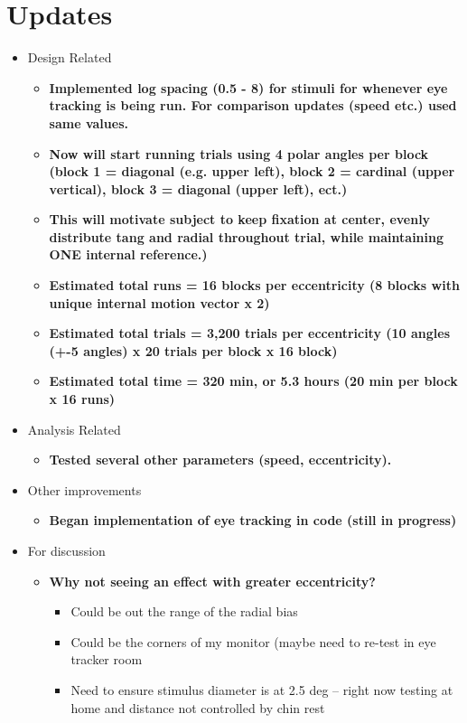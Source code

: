 \documentclass[11pt]{article} %
\begin{document}
\newpage
\section{Updates} 
\begin{itemize}
\item Design Related
	\begin{itemize}
	\item \textbf{Implemented log spacing (0.5 - 8) for stimuli for whenever eye tracking is being run. For comparison updates (speed etc.) used same values.}
	\item \textbf{Now will start running trials using 4 polar angles per block (block 1 = diagonal (e.g. upper left), block 2 = cardinal (upper vertical), block 3 = diagonal (upper left), ect.)}
	\item \textbf{This will motivate subject to keep fixation at center, evenly distribute tang and radial throughout trial, while maintaining ONE internal reference.)}
	\item \textbf{Estimated total runs = 16 blocks per eccentricity (8 blocks with unique internal motion vector x 2)}
	\item \textbf{Estimated total trials = 3,200 trials per eccentricity (10 angles (+-5 angles) x 20 trials per block x 16 block)}
	\item \textbf{Estimated total time = 320 min, or 5.3 hours (20 min per block x 16 runs)}
	\end{itemize}
\item Analysis Related
	\begin{itemize}
	\item \textbf{Tested several other parameters (speed, eccentricity).}
	\end{itemize}
\item Other improvements
	\begin{itemize}
	\item \textbf{Began implementation of eye tracking in code (still in progress)}
	\end{itemize}
\item For discussion
	\begin{itemize}
	\item \textbf{Why not seeing an effect with greater eccentricity?}
		\begin{itemize}
			\item{Could be out the range of the radial bias}
			\item{Could be the corners of my monitor (maybe need to re-test in eye tracker room}
			\item{Need to ensure stimulus diameter is at 2.5 deg -- right now testing at home and distance not controlled by chin rest}

\end{itemize}
\end{itemize}
\end{itemize}
\end{document}
